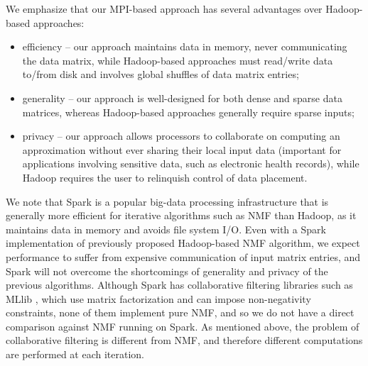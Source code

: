 We emphasize that our MPI-based approach has several advantages over Hadoop-based approaches:
\begin{itemize}
	\item efficiency -- our approach maintains data in memory, never communicating the data matrix, while Hadoop-based approaches must read/write data to/from disk and involves global shuffles of data matrix entries;
	\item generality -- our approach is well-designed for both dense and sparse data matrices, whereas Hadoop-based approaches generally require sparse inputs;
	\item privacy -- our approach allows processors to collaborate on computing an approximation without ever sharing their local input data (important for applications involving sensitive data, such as electronic health records), while Hadoop requires the user to relinquish control of data placement.
\end{itemize}

We note that Spark \cite{ZCFSS10} is a popular big-data processing infrastructure that is generally more efficient for iterative algorithms such as NMF than Hadoop, as it maintains data in memory and avoids file system I/O.
Even with a Spark implementation of previously proposed Hadoop-based NMF algorithm, we expect performance to suffer from expensive communication of input matrix entries, and Spark will not overcome the shortcomings of generality and privacy of the previous algorithms.
Although Spark has collaborative filtering libraries such as MLlib \cite{meng2015mllib}, which use matrix factorization and can impose non-negativity constraints, none of them implement pure NMF, and so we do not have a direct comparison against NMF running on Spark.
As mentioned above, the problem of collaborative filtering is different from NMF, and therefore different computations are performed at each iteration.


